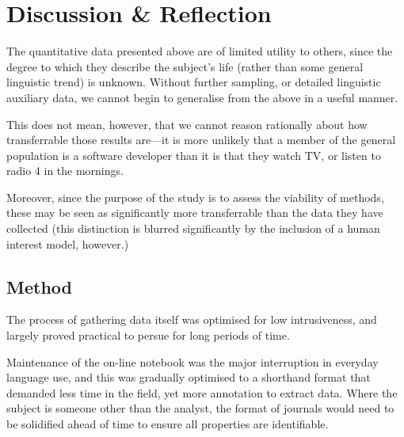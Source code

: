 




% 
% 
% 
% 
% 
% 






\section{Discussion \& Reflection}
The quantitative data presented above are of limited utility to others, since the degree to which they describe the subject's life (rather than some general linguistic trend) is unknown.  Without further sampling, or detailed linguistic auxiliary data, we cannot begin to generalise from the above in a useful manner.

This does not mean, however, that we cannot reason rationally about how transferrable those results are---it is more unlikely that a member of the general population is a software developer than it is that they watch TV, or listen to radio 4 in the mornings.

Moreover, since the purpose of the study is to assess the viability of methods, these may be seen as significantly more transferrable than the data they have collected (this distinction is blurred significantly by the inclusion of a human interest model, however.)






\subsection{Method}
The process of gathering data itself was optimised for low intrusiveness, and largely proved practical to persue for long periods of time.

Maintenance of the on-line notebook was the major interruption in everyday language use, and this was gradually optimised to a shorthand format that demanded less time in the field, yet more annotation to extract data.  Where the subject is someone other than the analyst, the format of journals would need to be solidified ahead of time to ensure all properties are identifiable.

